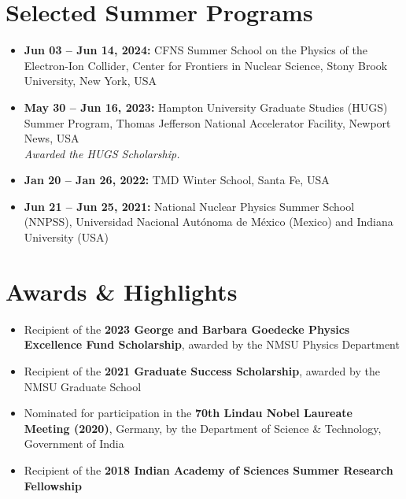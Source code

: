 \documentclass[11pt]{article}
\begin{document}
\section*{Selected Summer Programs}
\vspace{-0.3em}

\begin{itemize}
    \item \textbf{Jun 03 – Jun 14, 2024:} CFNS Summer School on the Physics of the Electron-Ion Collider, Center for Frontiers in Nuclear Science, Stony Brook University, New York, USA

    \item \textbf{May 30 – Jun 16, 2023:} Hampton University Graduate Studies (HUGS) Summer Program, Thomas Jefferson National Accelerator Facility, Newport News, USA \\
    \textit{Awarded the HUGS Scholarship.}

    \item \textbf{Jan 20 – Jan 26, 2022:} TMD Winter School, Santa Fe, USA

    \item \textbf{Jun 21 – Jun 25, 2021:} National Nuclear Physics Summer School (NNPSS), Universidad Nacional Autónoma de México (Mexico) and Indiana University (USA)
\end{itemize}

\section*{Awards \& Highlights}
\vspace{-0.3em}

\begin{itemize}
    \item Recipient of the \textbf{2023 George and Barbara Goedecke Physics Excellence Fund Scholarship}, awarded by the NMSU Physics Department

    \item Recipient of the \textbf{2021 Graduate Success Scholarship}, awarded by the NMSU Graduate School

    \item Nominated for participation in the \textbf{70th Lindau Nobel Laureate Meeting (2020)}, Germany, by the Department of Science \& Technology, Government of India

    \item Recipient of the \textbf{2018 Indian Academy of Sciences Summer Research Fellowship}
\end{itemize}
\end{document}
